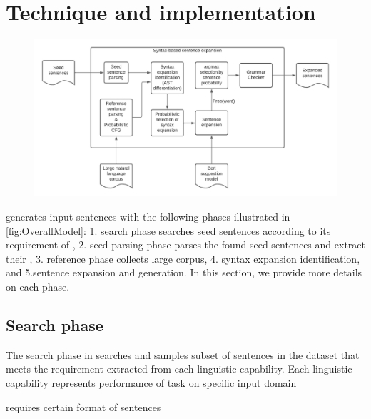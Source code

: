 \section{Technique and implementation}

\begin{figure}
  \centering
  \includegraphics[scale=0.5]{figs/overall.pdf}
  \vspace{-5pt}
  \caption{\OverallModelFigCaption}
  \vspace{-10pt}
\end{figure}

\Model generates input sentences with the following phases illustrated
in \ref{fig:OverallModel}: 1. search phase searches seed sentences according to
its requirement of \lc, 2. seed parsing phase parses the found seed
sentences and extract their \cfg, 3. reference phase collects large
corpus, 4. syntax expansion identification, and 5.sentence expansion
and generation. In this section, we provide more details on each phase.

\subsection{Search phase}
The search phase in \Model searches and samples subset of sentences in the
dataset that meets the requirement extracted from each linguistic
capability. Each linguistic capability represents performance of \nlp
task on specific input domain

requires certain format of sentences

